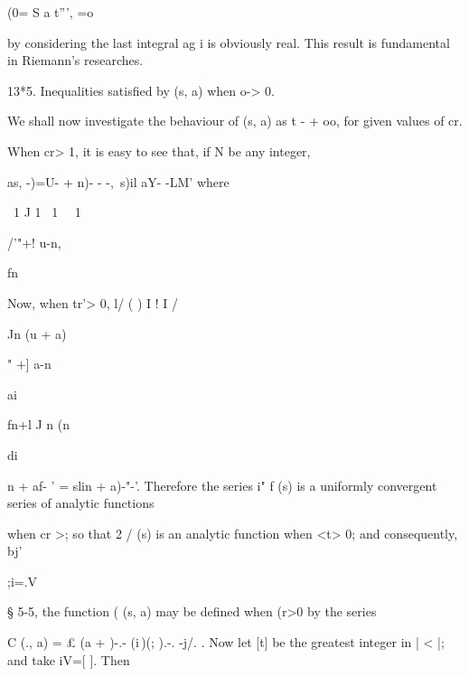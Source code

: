  (0= S a t''', =o

by considering the last integral ag i is obviously real. This result
is fundamental in Riemann's researches.

13*5. Inequalities satisfied by (s, a) when o-> 0.

We shall now investigate the behaviour of (s, a) as t - + oo, for
given values of cr.

When cr> 1, it is easy to see that, if N be any integer,

as, -)=U- + n)- - -,\ s)il aY- -LM' where

\ 1 J 1 \ 1 \ \ 1

/'"+! u-n,

fn

Now, when tr'> 0, l/ ( ) I ! I /

Jn (u + a)

" +] a-n

ai

fn+l J n (n

di

 n + af- ' = slin + a)-"-'. Therefore the series i" f (s) is a
uniformly convergent series of analytic functions

when cr >; so that 2 / (s) is an analytic function when <t> 0; and
consequently, bj'

;i=.V

§ 5-5, the function ( (s, a) may be defined when (r>0 by the series

C (., a) = £ (a + )-.- (i\,)(; ).-. -j/. . Now let [t] be the
greatest integer in | < |; and take iV=[ ]. Then


